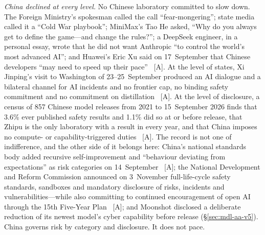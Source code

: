 \emph{China declined at every level.} No Chinese laboratory committed to slow down. The Foreign Ministry's spokesman called the call ``fear-mongering''; state media called it a ``Cold War playbook''; MiniMax's Tao He asked, ``Why do you always get to define the game---and change the rules?''; a DeepSeek engineer, in a personal essay, wrote that he did not want Anthropic ``to control the world's most advanced AI''; and Huawei's Eric Xu said on 17~September that Chinese developers ``may need to speed up their pace''~\cite{mdl-china-rejects-pacing} [A]. At the level of states, Xi Jinping's visit to Washington of 23--25~September produced an AI dialogue and a bilateral channel for AI incidents and no frontier cap, no binding safety commitment and no commitment on distillation~\cite{gov-summit-readings} [A]. At the level of disclosure, a census of 857 Chinese model releases from 2021 to 15~September 2026 finds that 3.6\% ever published safety results and 1.1\% did so at or before release, that Zhipu is the only laboratory with a result in every year, and that China imposes no compute- or capability-triggered duties~\cite{mdl-semianalysis-pacing} [A]. The record is not one of indifference, and the other side of it belongs here: China's national standards body added recursive self-improvement and ``behaviour deviating from expectations'' as risk categories on 14~September~\cite{mdl-semianalysis-pacing} [A]; the National Development and Reform Commission announced on 3~November full-life-cycle safety standards, sandboxes and mandatory disclosure of risks, incidents and vulnerabilities---while also committing to continued encouragement of open AI through the 15th Five-Year Plan~\cite{gov-ndrc-briefing} [A]; and Moonshot disclosed a deliberate reduction of its newest model's cyber capability before release (\S\ref{sec:mdl-aa-v5}). China governs risk by category and disclosure. It does not pace.

